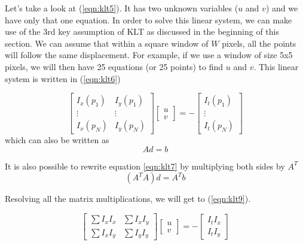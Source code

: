 \documentclass[]{IEEEtran}
\begin{document}
Let's take a look at (\ref{eqn:klt5}). It has two unknown variables ($u$ and $v$) and we have only that one equation. In order to solve this linear system, we can make use of the 3rd key assumption of KLT as discussed in the beginning of this section. We can assume that within a square window of $W$ pixels, all the points will follow the same displacement. For example, if we use a window of size 5x5 pixels, we will then have 25 equations (or 25 points) to find $u$ and $v$. This linear system is written in (\ref{eqn:klt6})

\begin{equation}\label{eqn:klt6}
    \begin{bmatrix}
    I_x(p_1) & I_y(p_1) \\
    \vdots & \vdots \\
    I_x(p_N) & I_y(p_N)
    \end{bmatrix}
    \begin{bmatrix}
    u \\ v
    \end{bmatrix}
    =
    -
    \begin{bmatrix}
    I_t(p_1) \\
    \vdots \\
    I_t(p_N)
    \end{bmatrix}
\end{equation}
which can also be written as
\begin{equation}\label{eqn:klt7}
    Ad = b
\end{equation}

It is also possible to rewrite equation \ref{eqn:klt7} by multiplying both sides by $A^T$
\begin{equation}\label{eqn:klt8}
    (A^T A)d = A^T b
\end{equation}

Resolving all the matrix multiplications, we will get to (\ref{eqn:klt9}).

\begin{equation}\label{eqn:klt9}
    \begin{bmatrix}
    \sum I_x I_x & \sum I_x I_y \\
    \sum I_x I_y & \sum I_y I_y
    \end{bmatrix}
    \begin{bmatrix}
    u \\ v
    \end{bmatrix}
    =
    -
    \begin{bmatrix}
    I_t I_x \\
    I_t I_y
    \end{bmatrix}
\end{equation}
\end{document}
